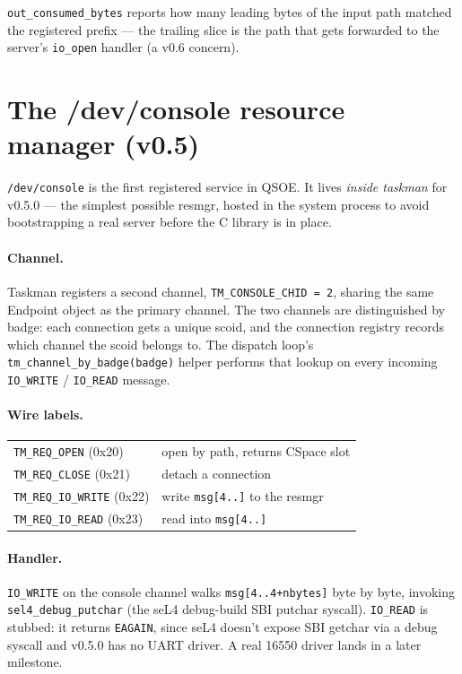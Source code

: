 \texttt{out\_consumed\_bytes} reports how many leading bytes of the
input path matched the registered prefix --- the trailing slice is
the path that gets forwarded to the server's \texttt{io\_open}
handler (a v0.6 concern).

\section{The /dev/console resource manager (v0.5)}

\texttt{/dev/console} is the first registered service in QSOE.  It
lives \emph{inside taskman} for v0.5.0 --- the simplest possible
resmgr, hosted in the system process to avoid bootstrapping a real
server before the C library is in place.

\paragraph{Channel.}  Taskman registers a second channel,
\texttt{TM\_CONSOLE\_CHID = 2}, sharing the same Endpoint object as
the primary channel.  The two channels are distinguished by badge:
each connection gets a unique scoid, and the connection registry
records which channel the scoid belongs to.  The dispatch loop's
\texttt{tm\_channel\_by\_badge(badge)} helper performs that lookup
on every incoming \texttt{IO\_WRITE} / \texttt{IO\_READ} message.

\paragraph{Wire labels.}
\begin{tabular}{ll}
\hline
\texttt{TM\_REQ\_OPEN}     (0x20) & open by path, returns CSpace slot \\
\texttt{TM\_REQ\_CLOSE}    (0x21) & detach a connection \\
\texttt{TM\_REQ\_IO\_WRITE} (0x22) & write \texttt{msg[4..]} to the resmgr \\
\texttt{TM\_REQ\_IO\_READ}  (0x23) & read into \texttt{msg[4..]} \\
\hline
\end{tabular}

\paragraph{Handler.}  \texttt{IO\_WRITE} on the console channel
walks \texttt{msg[4..4+nbytes]} byte by byte, invoking
\texttt{sel4\_debug\_putchar} (the seL4 debug-build SBI putchar
syscall).  \texttt{IO\_READ} is stubbed: it returns
\texttt{EAGAIN}, since seL4 doesn't expose SBI getchar via a debug
syscall and v0.5.0 has no UART driver.  A real 16550 driver lands
in a later milestone.


